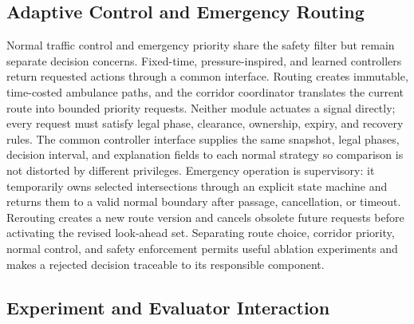 \subsection{Adaptive Control and Emergency Routing}

Normal traffic control and emergency priority share the safety filter but remain separate decision concerns. Fixed-time, pressure-inspired, and learned controllers return requested actions through a common interface. Routing creates immutable, time-costed ambulance paths, and the corridor coordinator translates the current route into bounded priority requests. Neither module actuates a signal directly; every request must satisfy legal phase, clearance, ownership, expiry, and recovery rules. The common controller interface supplies the same snapshot, legal phases, decision interval, and explanation fields to each normal strategy so comparison is not distorted by different privileges. Emergency operation is supervisory: it temporarily owns selected intersections through an explicit state machine and returns them to a valid normal boundary after passage, cancellation, or timeout. Rerouting creates a new route version and cancels obsolete future requests before activating the revised look-ahead set. Separating route choice, corridor priority, normal control, and safety enforcement permits useful ablation experiments and makes a rejected decision traceable to its responsible component.

\subsection{Experiment and Evaluator Interaction}
\label{sec:architecture}

